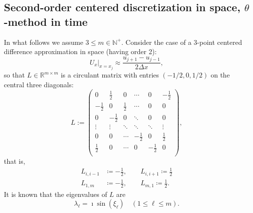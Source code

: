 \documentclass[a4paper]{article}
\newcommand{\dx}{\Delta x}
\newcommand{\nplus}{\mathbb{N}^+}
\begin{document}
\subsection{Second-order centered discretization in space, $\theta$-method in time}\label{sectioncentered}
In what follows we assume $3\le m\in\nplus$. Consider the case of a 3-point centered difference approximation in space (having order 2):
\[
    U_x\Big|_{x=x_j} \approx \frac{u_{j+1}-u_{j-1}}{2\dx},
\]
so that $L\in\mathbb{R}^{m\times m}$ is a circulant matrix with entries $(-1/2, 0, 1/2)$ on the central
three diagonals:
\begin{equation}\label{Ldef}
L:=\left(
\begin{array}{cccccc}
 0 & \frac{1}{2} & 0  & \cdots & 0 & -\frac{1}{2} \\
 -\frac{1}{2} & 0 & \frac{1}{2} &  \cdots & 0 & 0 \\
 0 & -\frac{1}{2} & 0 &  \ddots & 0 & 0\\
 \vdots  & \vdots  & \ddots  & \ddots & \ddots & \vdots \\
  0 & 0 & \cdots  & -\frac{1}{2} & 0 & \frac{1}{2} \\
 \frac{1}{2} & 0 & \cdots & 0 & -\frac{1}{2} & 0 \\
\end{array}
\right),
\end{equation}
that is,
\begin{subequations}
\begin{align}
    L_{i,i-1} & \coloneqq -\frac{1}{2},\quad\quad L_{i,i+1} \coloneqq  \frac{1}{2} \\
    L_{1,m} & \coloneqq -\frac{1}{2}, \quad \quad L_{m,1} \coloneqq \frac{1}{2}.
\end{align}
\end{subequations}
It is known that the eigenvalues of $L$ are 
\begin{equation}\label{Leigenvalues}
\lambda_\ell=\imath \sin(\xi_\ell)\quad (1\le\ell\le m).
\end{equation}
\end{document}
